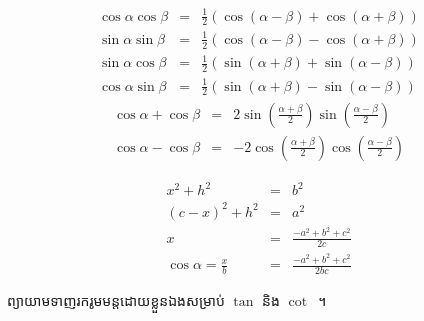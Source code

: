 \documentclass[fleqn,leqno,a4paper,11pt]{article}
\begin{document}
	\par\noindent
	\begin{minipage}{0.54\textwidth}
	\begin{eqnarray}
	\cos\alpha\cos\beta&=&\frac{1}{2}(\cos(\alpha-\beta)+\cos(\alpha+\beta))\\
	\sin\alpha\sin\beta&=&\frac{1}{2}(\cos(\alpha-\beta)-\cos(\alpha+\beta))\\
	\sin\alpha\cos\beta&=&\frac{1}{2}(\sin(\alpha+\beta)+\sin(\alpha-\beta))\\
	\cos\alpha\sin\beta&=&\frac{1}{2}(\sin(\alpha+\beta)-\sin(\alpha-\beta))
	\end{eqnarray}
	\begin{eqnarray}
	\cos\alpha+\cos\beta&=&2\sin(\frac{\alpha+\beta}{2})\sin(\frac{\alpha-\beta}{2})\\
	\cos\alpha-\cos\beta&=&-2\cos(\frac{\alpha+\beta}{2})\cos(\frac{\alpha-\beta}{2})
	\end{eqnarray}
	\end{minipage}
	\begin{minipage}{0.45\textwidth}
	\begin{eqnarray*}
	x^2+h^2&=&b^2\\
	(c-x)^2+h^2&=&a^2\\
	x&=&\frac{-a^2+b^2+c^2}{2c}\\
	\cos\alpha=\frac{x}{b}&=&\frac{-a^2+b^2+c^2}{2bc}
	\end{eqnarray*}
	\end{minipage}
	\par\noindent ព្យាយាមទាញរករូមមន្តដោយខ្លួនឯងសម្រាប់ $ \tan $ និង $ \cot $~។
\end{document}
